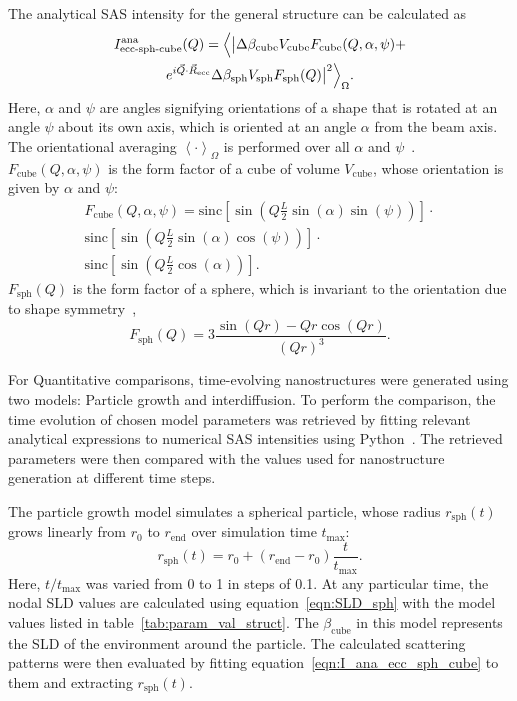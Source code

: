 \documentclass[preprint, 5p, times, twocolumn]{elsarticle}
\begin{document}
The analytical SAS intensity for the general structure can be calculated as 
%
\begin{multline}
\label{eqn:I_ana_ecc_sph_cube}
    I^{\text{ana}}_{\text{ecc-sph-cube}}(Q)=
    \Bigl\langle\bigl|\Delta\beta_{\text{cube}}V_{\text{cube}}F_{\text{cube}}(Q,\alpha,\psi)+\\
    e^{i\vec{Q}\cdot\vec{R}_{\text{ecc}}}\Delta\beta_{\text{sph}}
    V_{\text{sph}}F_{\text{sph}}(Q)\bigr|^2\Bigr\rangle_{\Omega}.
\end{multline}
% 
Here, $\alpha$ and $\psi$ are angles signifying orientations of a shape that is rotated at an angle $\psi$ about its own axis, which is oriented at an angle $\alpha$ from the beam axis. The orientational averaging $\left\langle \cdot \right\rangle_\Omega$ is performed over all $\alpha$ and $\psi$~\cite{porod1960formfactors, nayuk2012formfactors}. $F_{\text{cube}}(Q,\alpha,\psi)$ is the form factor of a cube of volume $V_{\text{cube}}$, whose orientation is given by $\alpha$ and $\psi$:
%
\begin{multline}
\label{eqn:F_cube}
    F_{\text{cube}}(Q,\alpha,\psi)=
    \text{sinc}\left[{\sin\left(Q\frac{L}{2}\sin(\alpha)\sin(\psi)\right)}\right]\cdot\\
    \text{sinc}\left[{\sin\left(Q\frac{L}{2}\sin(\alpha)\cos(\psi)\right)}\right] \cdot \\
    \text{sinc}\left[{\sin\left(Q\frac{L}{2}\cos(\alpha)\right)}\right].
\end{multline}
%
$F_{\text{sph}}(Q)$ is the form factor of a sphere, which is invariant to the orientation due to shape symmetry~\cite{sivia2011elementary},
%
\begin{equation}
\label{eqn:F_sph}
    F_{\text{sph}}(Q) = 3 \frac{\sin(Qr)-Qr\cos(Qr)}{(Qr)^3} .
\end{equation}

For Quantitative comparisons, time-evolving nanostructures were generated using two models: Particle growth and interdiffusion. To perform the comparison, the time evolution of chosen model parameters was retrieved by fitting relevant analytical expressions to numerical SAS intensities using Python~\cite{2020SciPy-NMeth, python}. The retrieved parameters were then compared with the values used for nanostructure generation at different time steps.

The particle growth model simulates a spherical particle, whose radius $r_{\text{sph}}(t)$ grows linearly from $r_0$ to $r_{\text{end}}$ over simulation time $t_{\text{max}}$:
%
\begin{equation}
    \label{r_gg(t)}
    r_{\text{sph}}(t)=r_0 + (r_{\text{end}}-r_0) \frac{t}{t_{\text{max}}}.
\end{equation}
%
Here, $t/t_{\text{max}}$ was varied from 0 to 1 in steps of 0.1. At any particular time, the nodal SLD values are calculated using equation~\ref{eqn:SLD_sph} with the model values listed in table~\ref{tab:param_val_struct}. The $\beta_{\text{cube}}$ in this model represents the SLD of the environment around the particle. The calculated scattering patterns were then evaluated by fitting equation~\ref{eqn:I_ana_ecc_sph_cube} to them and extracting $r_\text{sph}(t)$.
\end{document}
